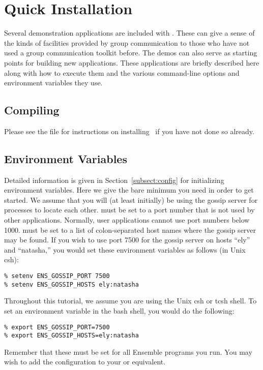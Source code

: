 \section{Quick Installation} 

Several demonstration applications are included with \ensemble.
These can give a sense of the kinds of facilities provided by group
communication to those who have not used a group communication
toolkit before.  The demos can also serve as starting points for
building new applications.  These applications are briefly described
here along with how to execute them and the various command-line
options and environment variables they use.

\subsection{Compiling}
Please see the file  for instructions on
installing \ensemble\ if you have not done so already.

\subsection{Environment Variables}
Detailed information is given in Section~\ref{subsect:config} for
initializing environment variables.  Here we give the bare minimum
you need in order to get started.  We assume that you will (at least
initially) be using the gossip server for processes to locate each
other.   must be set to a port number that
is not used by other applications.  Normally, user applications
cannot use port numbers below 1000.   must
be set to a list of colon-separated host names where the gossip
server may be found.  If you wish to use port 7500 for the gossip
server on hosts ``ely'' and ``natasha,'' you would set these
environment variables as follows (in Unix csh):
\begin{verbatim}
% setenv ENS_GOSSIP_PORT 7500
% setenv ENS_GOSSIP_HOSTS ely:natasha
\end{verbatim}

Throughout this tutorial, we assume you are using the Unix csh or
tcsh shell.  To set an environment variable in the bash shell, you
would do the following:
\begin{verbatim}
% export ENS_GOSSIP_PORT=7500
% export ENS_GOSSIP_HOSTS=ely:natasha
\end{verbatim}

Remember that these must be set for all Ensemble programs you run.
You may wish to add the configuration to your  or
equivalent.

